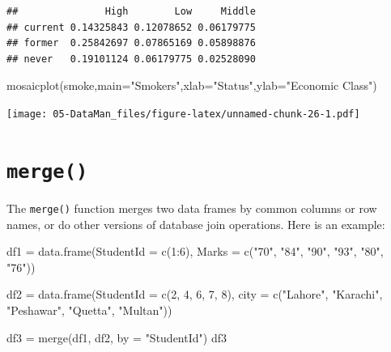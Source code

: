 \documentclass[
]{book}
\newenvironment{Shaded}{\begin{snugshade}}{\end{snugshade}}
\newcommand{\AttributeTok}[1]{\textcolor[rgb]{0.77,0.63,0.00}{#1}}
\newcommand{\DecValTok}[1]{\textcolor[rgb]{0.00,0.00,0.81}{#1}}
\newcommand{\FunctionTok}[1]{\textcolor[rgb]{0.00,0.00,0.00}{#1}}
\newcommand{\NormalTok}[1]{#1}
\newcommand{\OtherTok}[1]{\textcolor[rgb]{0.56,0.35,0.01}{#1}}
\newcommand{\SpecialCharTok}[1]{\textcolor[rgb]{0.00,0.00,0.00}{#1}}
\newcommand{\StringTok}[1]{\textcolor[rgb]{0.31,0.60,0.02}{#1}}
\begin{document}
\begin{verbatim}
##               High        Low     Middle
## current 0.14325843 0.12078652 0.06179775
## former  0.25842697 0.07865169 0.05898876
## never   0.19101124 0.06179775 0.02528090
\end{verbatim}

\begin{Shaded}
\begin{Highlighting}[]
\FunctionTok{mosaicplot}\NormalTok{(smoke,}\AttributeTok{main=}\StringTok{"Smokers"}\NormalTok{,}\AttributeTok{xlab=}\StringTok{"Status"}\NormalTok{,}\AttributeTok{ylab=}\StringTok{"Economic Class"}\NormalTok{)}
\end{Highlighting}
\end{Shaded}

\texttt{[image: 05-DataMan\_files/figure-latex/unnamed-chunk-26-1.pdf]}

\hypertarget{merge}{%
\section{\texorpdfstring{\texttt{merge()}}{merge()}}\label{merge}}

The \texttt{merge()} function merges two data frames by common columns or row names, or do other versions of database join operations. Here is an example:

\begin{Shaded}
\begin{Highlighting}[]
\NormalTok{df1 }\OtherTok{=} \FunctionTok{data.frame}\NormalTok{(}\AttributeTok{StudentId =} \FunctionTok{c}\NormalTok{(}\DecValTok{1}\SpecialCharTok{:}\DecValTok{6}\NormalTok{), }
                 \AttributeTok{Marks =} \FunctionTok{c}\NormalTok{(}\StringTok{"70"}\NormalTok{, }\StringTok{"84"}\NormalTok{, }\StringTok{"90"}\NormalTok{, }\StringTok{"93"}\NormalTok{, }\StringTok{"80"}\NormalTok{, }\StringTok{"76"}\NormalTok{))}

\NormalTok{df2 }\OtherTok{=} \FunctionTok{data.frame}\NormalTok{(}\AttributeTok{StudentId =} \FunctionTok{c}\NormalTok{(}\DecValTok{2}\NormalTok{, }\DecValTok{4}\NormalTok{, }\DecValTok{6}\NormalTok{, }\DecValTok{7}\NormalTok{, }\DecValTok{8}\NormalTok{), }
                 \AttributeTok{city =} \FunctionTok{c}\NormalTok{(}\StringTok{"Lahore"}\NormalTok{, }\StringTok{"Karachi"}\NormalTok{, }\StringTok{"Peshawar"}\NormalTok{, }\StringTok{"Quetta"}\NormalTok{, }\StringTok{"Multan"}\NormalTok{)) }

\NormalTok{df3 }\OtherTok{=} \FunctionTok{merge}\NormalTok{(df1, df2, }\AttributeTok{by =} \StringTok{"StudentId"}\NormalTok{)}
\NormalTok{df3}
\end{Highlighting}
\end{Shaded}
\end{document}
